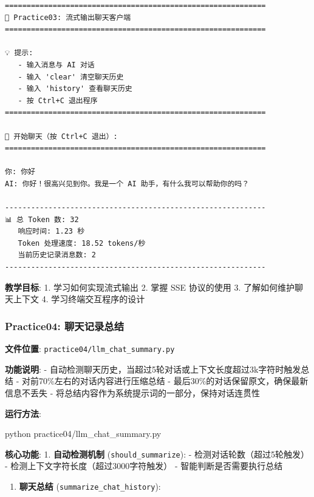 \documentclass[]{article}
\newenvironment{Shaded}{}{}
\newcommand{\ExtensionTok}[1]{#1}
\newcommand{\NormalTok}[1]{#1}
\providecommand{\tightlist}{%
  \setlength{\itemsep}{0pt}\setlength{\parskip}{0pt}}
\begin{document}
\begin{verbatim}
============================================================
🚀 Practice03: 流式输出聊天客户端
============================================================

💡 提示:
   - 输入消息与 AI 对话
   - 输入 'clear' 清空聊天历史
   - 输入 'history' 查看聊天历史
   - 按 Ctrl+C 退出程序
============================================================

💬 开始聊天（按 Ctrl+C 退出）:
============================================================

你: 你好
AI: 你好！很高兴见到你。我是一个 AI 助手，有什么我可以帮助你的吗？

------------------------------------------------------------
📊 总 Token 数: 32
   响应时间: 1.23 秒
   Token 处理速度: 18.52 tokens/秒
   当前历史记录消息数: 2
------------------------------------------------------------
\end{verbatim}

\textbf{教学目标}: 1. 学习如何实现流式输出 2. 掌握 SSE 协议的使用 3.
了解如何维护聊天上下文 4. 学习终端交互程序的设计

\subsubsection{Practice04:
聊天记录总结}\label{practice04-ux804aux5929ux8bb0ux5f55ux603bux7ed3}

\textbf{文件位置}: \texttt{practice04/llm\_chat\_summary.py}

\textbf{功能说明}: -
自动检测聊天历史，当超过5轮对话或上下文长度超过3k字符时触发总结 -
对前70\%左右的对话内容进行压缩总结 -
最后30\%的对话保留原文，确保最新信息不丢失 -
将总结内容作为系统提示词的一部分，保持对话连贯性

\textbf{运行方法}:

\begin{Shaded}
\begin{Highlighting}[]
\ExtensionTok{python}\NormalTok{ practice04/llm_chat_summary.py}
\end{Highlighting}
\end{Shaded}

\textbf{核心功能}: 1. \textbf{自动检测机制}
(\texttt{should\_summarize}): - 检测对话轮数（超过5轮触发） -
检测上下文字符长度（超过3000字符触发） - 智能判断是否需要执行总结

\begin{enumerate}
\def\labelenumi{\arabic{enumi}.}
\setcounter{enumi}{1}
\tightlist
\item
  \textbf{聊天总结} (\texttt{summarize\_chat\_history}):
\end{enumerate}
\end{document}
